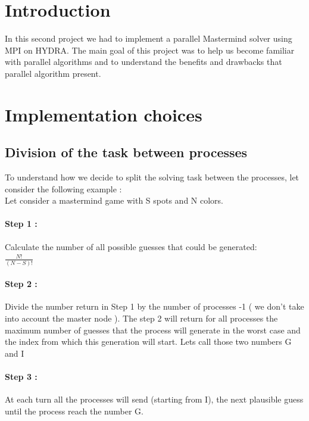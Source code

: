 \section{Introduction}

In this second project we had to implement a parallel Mastermind solver using MPI on HYDRA.
The main goal of this project was to help us become familiar with parallel algorithms and to understand the benefits and drawbacks that parallel algorithm present.

\section{Implementation choices}
\subsection{Division of the task between processes}
To understand how we decide to split the solving task between the processes, let consider the following example : \\
Let consider a mastermind game with S spots and N colors.
\paragraph{Step 1 : } Calculate the number of all possible guesses that could be generated: \\

$ \frac{N!}{(N-S)!} $

\paragraph{Step 2 : } Divide the number return in Step 1 by the number of processes -1 ( we don't take into account the master node ). The step 2 will return for all processes the maximum number of guesses that the process will generate in the worst case and the index from which this generation will start. Lets call those two numbers G and I

\paragraph{Step 3 : } At each turn all the processes will send (starting from I), the next plausible guess until the process reach the number  G.

